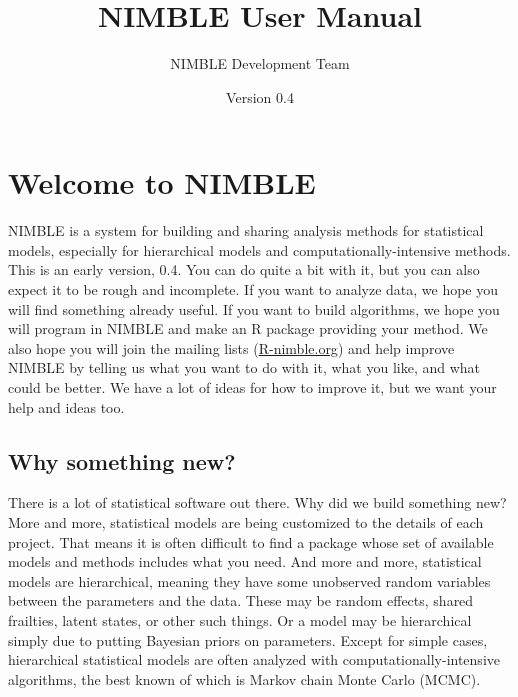 \documentclass[12pt,oneside]{book}\usepackage[]{graphicx}\usepackage[]{color}
\newcommand{\ver}{0.4}
\begin{document}




\title{NIMBLE User Manual}
\author{NIMBLE Development Team}
\date{Version \ver}
\maketitle



\begingroup
\hypersetup{linkcolor=blue}
\tableofcontents
\endgroup





\chapter{Welcome to NIMBLE}
\label{sec:welcome-nimble}

NIMBLE is a system for building and sharing analysis methods for
statistical models, especially for hierarchical models and
computationally-intensive methods.  This is an early version,
\ver. You can do quite a bit with it, but you can also expect it to be rough
and incomplete.  If you want to analyze data, we hope you will find
something already useful.  If you want to build algorithms, we hope
you will program in NIMBLE and make an R package providing your
method.  We also hope you will join the mailing lists
(\href{http://R-nimble.org}{R-nimble.org}) and help improve NIMBLE by
telling us what you want to do with it, what you like, and what could
be better.  We have a lot of ideas for how to improve it, but we want
your help and ideas too.

\section{Why something new?}
\label{sec:why-something-new}

There is a lot of statistical software out there.  Why did we build
something new?  More and more, statistical models are being customized
to the details of each project.  That means it is often difficult to
find a package whose set of available models and methods includes what
you need.  And more and more, statistical models are hierarchical,
meaning they have some unobserved random variables between the
parameters and the data.  These may be random effects, shared
frailties, latent states, or other such things.  Or a model may be
hierarchical simply due to putting Bayesian priors on parameters.
Except for simple cases, hierarchical statistical models are often
analyzed with computationally-intensive algorithms, the best known of
which is Markov chain Monte Carlo (MCMC).
\end{document}
